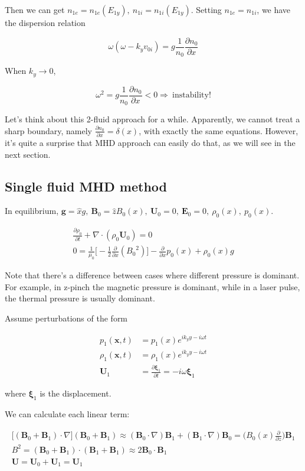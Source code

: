 \documentclass[
  notoc %
]{tufte-book}
\begin{document}
Then we can get \(n_{1e}=n_{1e}(E_{1y}),\ n_{1i}=n_{1i}(E_{1y})\).
Setting \(n_{1e}=n_{1i}\), we have the dispersion relation

\[
\omega(\omega-k_y v_{0i})=g\frac{1}{n_0}\frac{\partial n_0}{\partial x}
\]

When \(k_y\rightarrow0\),

\[
\omega^2=g\frac{1}{n_0}\frac{\partial n_0}{\partial x}<0 \Rightarrow\ \text{instability!}
\]

Let's think about this 2-fluid approach for a while. Apparently, we
cannot treat a sharp boundary, namely
\(\frac{\partial n_0}{\partial x}=\delta(x)\), with exactly the same
equations. However, it's quite a surprise that MHD approach can easily
do that, as we will see in the next section.

\hypertarget{single-fluid-mhd-method}{%
\subsection{Single fluid MHD method}\label{single-fluid-mhd-method}}

In equilibrium,
\(\mathbf{g}=\hat{x}g,\ \mathbf{B}_0=\hat{z}B_0(x),\ \mathbf{U}_0=0,\ \mathbf{E}_0=0,\ \rho_0(x),\ p_0(x)\).

\[
\begin{aligned}
\frac{\partial \rho_0}{\partial t}+\nabla\cdot(\rho_0 \mathbf{U}_0)=0 \\
0=\frac{1}{\mu_0}\Big[ -\frac{1}{2}\frac{\partial}{\partial x}({B_0}^2)\Big] -\frac{\partial}{\partial x}p_0(x)+\rho_0(x)g
\end{aligned}
\]

Note that there's a difference between cases where different pressure is
dominant. For example, in z-pinch the magnetic pressure is dominant,
while in a laser pulse, the thermal pressure is usually dominant.

Assume perturbations of the form

\[
\begin{aligned}
p_1(\mathbf{x},t) &= p_1(x) e^{ik_y y-i\omega t} \\
\rho_1(\mathbf{x},t) &= \rho_1(x) e^{i k_y y-i\omega t} \\
\mathbf{U}_1 &=\frac{\partial \pmb{\xi}_1}{\partial t}=-i\omega\pmb{\xi}_1
\end{aligned}
\]

where \(\pmb{\xi}_1\) is the displacement.

We can calculate each linear term:

\[
\begin{aligned}
\big[(\mathbf{B}_0+\mathbf{B}_1)\cdot\nabla \big](\mathbf{B}_0+\mathbf{B}_1) \approx (\mathbf{B}_0\cdot\nabla)\mathbf{B}_1 + (\mathbf{B}_1\cdot\nabla)\mathbf{B}_0 = \big( B_0(x)\frac{\partial}{\partial z}\big)\mathbf{B}_1 \\
B^2 = (\mathbf{B}_0+\mathbf{B}_1)\cdot(\mathbf{B}_1+\mathbf{B}_1)\approx 2\mathbf{B}_0\cdot\mathbf{B}_1 \\
\mathbf{U} = \mathbf{U}_0+\mathbf{U}_1 = \mathbf{U}_1
\end{aligned}
\]
\end{document}
